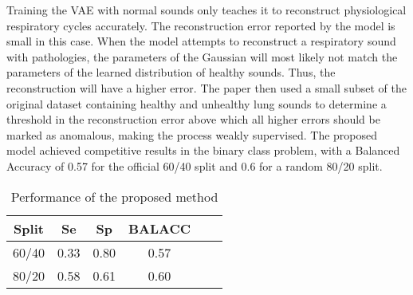 Training the VAE with normal sounds only teaches it to reconstruct physiological respiratory cycles accurately. The reconstruction error reported by the model is small in this case. When the model attempts to reconstruct a respiratory sound with pathologies, the parameters of the Gaussian will most likely not match the parameters of the learned distribution of healthy sounds. Thus, the reconstruction will have a higher error. The paper then used a small subset of the original dataset containing healthy and unhealthy lung sounds to determine a threshold in the reconstruction error above which all higher errors should be marked as anomalous, making the process weakly supervised. The proposed model achieved competitive results in the binary class problem, with a Balanced Accuracy of 0.57 for the official 60/40 split and 0.6 for a random 80/20 split.

\begin{table}[h!]
    \centering
    \caption{Performance of the proposed method}
    \begin{tabular}{cccccc}
    \toprule
    \textbf{Split} & \textbf{Se} & \textbf{Sp} & \textbf{BALACC} \\
    \midrule
    60/40 & 0.33 & 0.80 & 0.57 \\
    80/20 & 0.58 & 0.61 & 0.60 \\
    \bottomrule
    \end{tabular}
\end{table}


